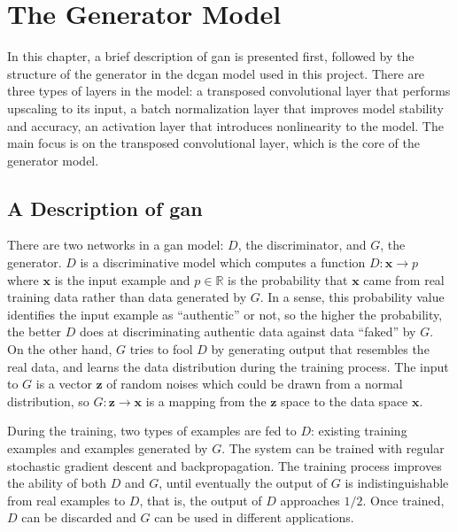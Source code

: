 
\chapter{The Generator Model}

In this chapter, a brief description of \gls{gan} \cite{goodfellow:gan} is presented first, followed by the
structure of the generator in the \gls{dcgan} model used in this project. There are three types of layers in
the model: a transposed convolutional layer that performs upscaling to its input, a batch normalization layer
that improves model stability and accuracy, an activation layer that introduces nonlinearity to the model.
The main focus is on the transposed convolutional layer, which is the core of the generator model.

\section{A Description of \gls{gan}}

There are two networks in a \gls{gan} model: $D$, the discriminator, and $G$, the generator. $D$ is a
discriminative model which computes a function $D: \boldsymbol{x} \rightarrow p$ where $\boldsymbol{x}$ is the
input example and $p \in \mathbb{R}$ is the probability that $\boldsymbol{x}$ came from real training data
rather than data generated by $G$. In a sense, this probability value identifies the input example as
``authentic'' or not, so the higher the probability, the better $D$ does at discriminating authentic data
against data ``faked'' by $G$. On the other hand, $G$ tries to fool $D$ by generating output that resembles
the real data, and learns the data distribution during the training process. The input to $G$ is a vector
$\boldsymbol{z}$ of random noises which could be drawn from a normal distribution, so $G: \boldsymbol{z}
\rightarrow \boldsymbol{x}$ is a mapping from the $\boldsymbol{z}$ space to the data space $\boldsymbol{x}$.

During the training, two types of examples are fed to $D$: existing training examples and examples generated
by $G$. The system can be trained with regular stochastic gradient descent and backpropagation. The training
process improves the ability of both $D$ and $G$, until eventually the output of $G$ is indistinguishable
from real examples to $D$, that is, the output of $D$ approaches $1/2$. Once trained, $D$ can be discarded
and $G$ can be used in different applications.

